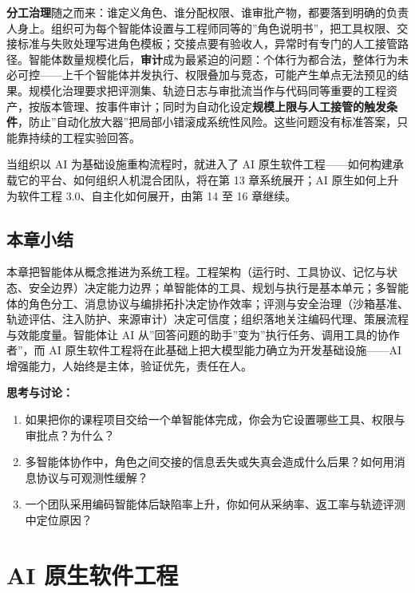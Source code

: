 \documentclass[
]{ctexbook}
\providecommand{\tightlist}{\setlength{\itemsep}{0pt}\setlength{\parskip}{0pt} }
\begin{document}
\textbf{分工治理}随之而来：谁定义角色、谁分配权限、谁审批产物，都要落到明确的负责人身上。组织可为每个智能体设置与工程师同等的''角色说明书''，把工具权限、交接标准与失败处理写进角色模板；交接点要有验收人，异常时有专门的人工接管路径。智能体数量规模化后，\textbf{审计}成为最紧迫的问题：个体行为都合法，整体行为未必可控------上千个智能体并发执行、权限叠加与竞态，可能产生单点无法预见的结果。规模化治理要求把评测集、轨迹日志与审批流当作与代码同等重要的工程资产，按版本管理、按事件审计；同时为自动化设定\textbf{规模上限与人工接管的触发条件}，防止''自动化放大器''把局部小错滚成系统性风险。这些问题没有标准答案，只能靠持续的工程实验回答。

当组织以 AI 为基础设施重构流程时，就进入了 AI
原生软件工程------如何构建承载它的平台、如何组织人机混合团队，将在第 13
章系统展开；AI 原生如何上升为软件工程 3.0、自主化如何展开，由第 14 至 16
章继续。

\section{本章小结}\label{ux672cux7ae0ux5c0fux7ed3-11}

本章把智能体从概念推进为系统工程。工程架构（运行时、工具协议、记忆与状态、安全边界）决定能力边界；单智能体的工具、规划与执行是基本单元；多智能体的角色分工、消息协议与编排拓扑决定协作效率；评测与安全治理（沙箱基准、轨迹评估、注入防护、来源审计）决定可信度；组织落地关注编码代理、策展流程与效能度量。智能体让
AI 从''回答问题的助手''变为''执行任务、调用工具的协作者''，而 AI
原生软件工程将在此基础上把大模型能力确立为开发基础设施------AI
增强能力，人始终是主体，验证优先，责任在人。

\textbf{思考与讨论：}

\begin{enumerate}
\def\labelenumi{\arabic{enumi}.}
\tightlist
\item
  如果把你的课程项目交给一个单智能体完成，你会为它设置哪些工具、权限与审批点？为什么？
\item
  多智能体协作中，角色之间交接的信息丢失或失真会造成什么后果？如何用消息协议与可观测性缓解？
\item
  一个团队采用编码智能体后缺陷率上升，你如何从采纳率、返工率与轨迹评测中定位原因？
\end{enumerate}

\chapter{AI 原生软件工程}\label{ai-ux539fux751fux8f6fux4ef6ux5de5ux7a0b}
\end{document}

